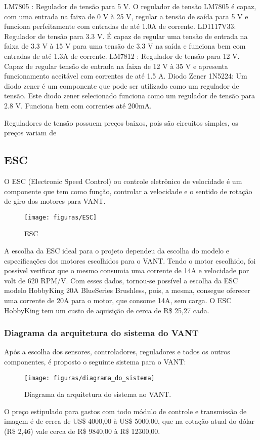 LM7805 : Regulador de tensão para 5 V. O regulador de tensão LM7805 é capaz, com uma entrada na faixa de 0 V à 25 V, regular a tensão de saída para 5 V e funciona perfeitamente com entradas de até 1.0A de corrente. \cite{dataLM7805}
LD1117V33: Regulador de tensão para 3.3 V. É capaz de regular uma tensão de entrada na faixa de 3.3 V à 15 V para uma tensão de 3.3 V na saída e funciona bem com entradas de até 1.3A de corrente. \cite{dataLD111}
LM7812 : Regulador de tensão para 12 V. Capaz de regular tensão de entrada na faixa de 12 V à 35 V e apresenta funcionamento aceitável com correntes de até 1.5 A.\cite{dataLM7812}
Diodo Zener 1N5224: Um diodo zener é um componente que pode ser utilizado como um regulador de tensão. Este diodo zener selecionado funciona como um regulador de tensão para 2.8 V. Funciona bem com correntes até 200mA.\cite{data1N5224}

Reguladores de tensão possuem preços baixos, pois são circuitos simples, os preços variam de

\subsection{ESC}

O ESC (Electronic Speed Control) ou controle eletrônico de velocidade é um componente que tem como função, controlar a velocidade e o sentido de rotação de giro dos motores para VANT.

\begin{figure}[H]
\centering\texttt{[image: figuras/ESC]}
\caption{ESC}
\end{figure}

A escolha da ESC ideal para o projeto dependeu da escolha do modelo e especificações dos motores escolhidos para o VANT. Tendo o motor escolhido, foi possível verificar que o mesmo consumia uma corrente de 14A e velocidade por volt de 620 RPM/V. Com esses dados, tornou-se possível a escolha da ESC modelo HobbyKing 20A BlueSeries Brushless, pois, a mesma, consegue oferecer uma corrente de 20A para o motor, que consome 14A, sem carga. O ESC HobbyKing tem um custo de aquisição de cerca de R\$ 25,27 cada.


\subsubsection{Diagrama da arquitetura do sistema do VANT}

Após a escolha dos sensores, controladores, reguladores e todos os outros componentes, é proposto o seguinte sistema para o VANT:


\begin{figure}[H]
\centering\texttt{[image: figuras/diagrama\_do\_sistema]}
\caption{Diagrama da arquitetura do sistema no VANT.}
\end{figure}

O preço estipulado para gastos com todo módulo de controle e transmissão de imagem é de cerca de US\$ 4000,00 à US\$ 5000,00, que na cotação atual do dólar (R\$ 2,46)\cite{dolar2014} vale cerca de R\$ 9840,00 à R\$ 12300,00.
